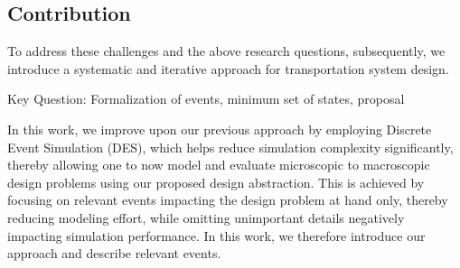 \documentclass[graybox]{svmult}
\begin{document}
\subsection{Contribution}
To address these challenges and the above research questions, subsequently, we introduce a systematic and iterative approach for transportation system design.


Key Question: Formalization of events, minimum set of states, proposal

In this work, we improve upon our previous approach by employing Discrete Event Simulation (DES), which helps reduce simulation complexity significantly, thereby allowing one to now model and evaluate microscopic to macroscopic design problems using our proposed design abstraction. This is achieved by focusing on relevant events impacting the design problem at hand only, thereby reducing modeling effort, while omitting unimportant details negatively impacting simulation performance. In this work, we therefore introduce our approach and describe relevant events. 
\end{document}
